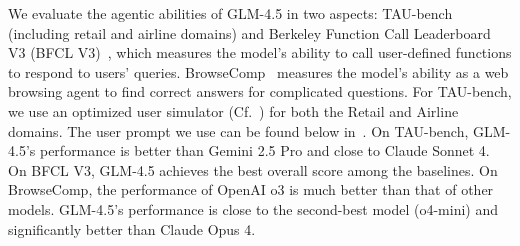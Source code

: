\documentclass{article}
\theoremstyle{definition}
\begin{document}
We evaluate the agentic abilities of GLM-4.5 in two aspects: TAU-bench~\cite{yao2024tau} (including retail and airline domains) and Berkeley Function Call Leaderboard V3 (BFCL V3)~\cite{patil2025bfcl}, which measures the model's ability to call user-defined functions to respond to users' queries. BrowseComp~\cite{wei2025browsecomp} measures the model's ability as a web browsing agent to find correct answers for complicated questions. For TAU-bench, we use an optimized user simulator (Cf.~) for both the Retail and Airline domains. The user prompt we use can be found below in~. 
On TAU-bench, GLM-4.5's performance is better than Gemini 2.5 Pro and close to Claude Sonnet 4. On BFCL V3, GLM-4.5 achieves the best overall score among the baselines. On BrowseComp, the performance of OpenAI o3 is much better than that of other models. GLM-4.5's performance is close to the second-best model (o4-mini) and significantly better than Claude Opus 4.
\end{document}
